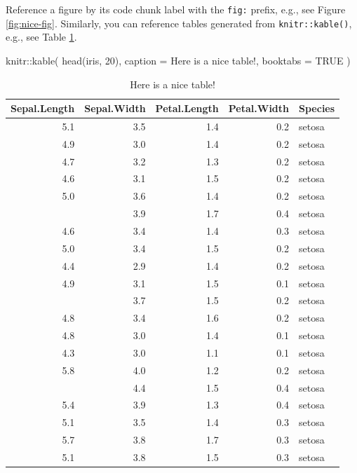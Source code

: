\documentclass[
  12pt,
]{book}
\newenvironment{Shaded}{\begin{snugshade}}{\end{snugshade}}
\newcommand{\AttributeTok}[1]{\textcolor[rgb]{0.77,0.63,0.00}{#1}}
\newcommand{\ConstantTok}[1]{\textcolor[rgb]{0.00,0.00,0.00}{#1}}
\newcommand{\DecValTok}[1]{\textcolor[rgb]{0.00,0.00,0.81}{#1}}
\newcommand{\FunctionTok}[1]{\textcolor[rgb]{0.00,0.00,0.00}{#1}}
\newcommand{\NormalTok}[1]{#1}
\newcommand{\SpecialCharTok}[1]{\textcolor[rgb]{0.00,0.00,0.00}{#1}}
\newcommand{\StringTok}[1]{\textcolor[rgb]{0.31,0.60,0.02}{#1}}
\begin{document}
Reference a figure by its code chunk label with the \texttt{fig:} prefix, e.g., see Figure \ref{fig:nice-fig}. Similarly, you can reference tables generated from \texttt{knitr::kable()}, e.g., see Table \ref{tab:nice-tab}.

\begin{Shaded}
\begin{Highlighting}[]
\NormalTok{knitr}\SpecialCharTok{::}\FunctionTok{kable}\NormalTok{(}
  \FunctionTok{head}\NormalTok{(iris, }\DecValTok{20}\NormalTok{), }\AttributeTok{caption =} \StringTok{\textquotesingle{}Here is a nice table!\textquotesingle{}}\NormalTok{,}
  \AttributeTok{booktabs =} \ConstantTok{TRUE}
\NormalTok{)}
\end{Highlighting}
\end{Shaded}

\begin{table}

\caption{\label{tab:nice-tab}Here is a nice table!}
\centering
\begin{tabular}[t]{rrrrl}
\toprule
Sepal.Length & Sepal.Width & Petal.Length & Petal.Width & Species\\
\midrule
5.1 & 3.5 & 1.4 & 0.2 & setosa\\
4.9 & 3.0 & 1.4 & 0.2 & setosa\\
4.7 & 3.2 & 1.3 & 0.2 & setosa\\
4.6 & 3.1 & 1.5 & 0.2 & setosa\\
5.0 & 3.6 & 1.4 & 0.2 & setosa\\
\addlinespace
5.4 & 3.9 & 1.7 & 0.4 & setosa\\
4.6 & 3.4 & 1.4 & 0.3 & setosa\\
5.0 & 3.4 & 1.5 & 0.2 & setosa\\
4.4 & 2.9 & 1.4 & 0.2 & setosa\\
4.9 & 3.1 & 1.5 & 0.1 & setosa\\
\addlinespace
5.4 & 3.7 & 1.5 & 0.2 & setosa\\
4.8 & 3.4 & 1.6 & 0.2 & setosa\\
4.8 & 3.0 & 1.4 & 0.1 & setosa\\
4.3 & 3.0 & 1.1 & 0.1 & setosa\\
5.8 & 4.0 & 1.2 & 0.2 & setosa\\
\addlinespace
5.7 & 4.4 & 1.5 & 0.4 & setosa\\
5.4 & 3.9 & 1.3 & 0.4 & setosa\\
5.1 & 3.5 & 1.4 & 0.3 & setosa\\
5.7 & 3.8 & 1.7 & 0.3 & setosa\\
5.1 & 3.8 & 1.5 & 0.3 & setosa\\
\bottomrule
\end{tabular}
\end{table}
\end{document}
